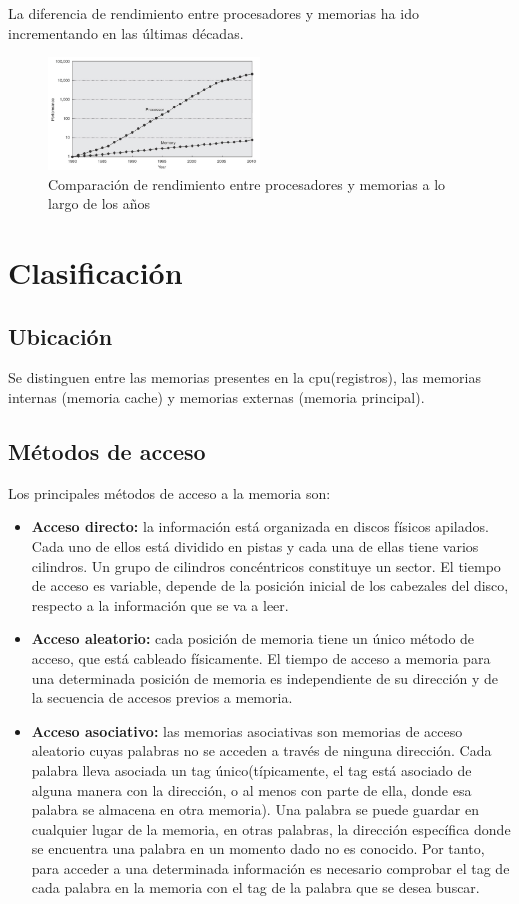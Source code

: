 La diferencia de rendimiento entre procesadores y memorias ha ido incrementando en las últimas décadas.
\begin{figure}[H]
	\centering
	\includegraphics[width=0.5\textwidth]{images/Tema_5/Grafico_Memorias.PNG}
	\caption{Comparación de rendimiento entre procesadores y memorias a lo largo de los años}
\end{figure}


\section{Clasificación}
\subsection{Ubicación}
Se distinguen entre las memorias presentes en la \gls{cpu}(registros), las memorias internas (memoria cache) y memorias externas (memoria principal).
\subsection{Métodos de acceso}
Los principales métodos de acceso a la memoria son:

\begin{itemize}
	\item\textbf{Acceso directo:} la información está organizada en discos físicos apilados. Cada uno de ellos está dividido en pistas y cada una de ellas tiene varios cilindros. Un  grupo de cilindros concéntricos constituye un sector. El tiempo de acceso es variable, depende de la posición inicial de los cabezales del disco, respecto a la información que se va a leer.
	\item\textbf{Acceso aleatorio:} cada posición de memoria tiene un único método de acceso, que está cableado físicamente. El tiempo de acceso a memoria para una determinada posición de memoria es independiente de su dirección y de la secuencia de accesos previos a memoria.
	\item\textbf{Acceso asociativo:} las memorias asociativas son memorias de acceso aleatorio cuyas palabras no se acceden a través de ninguna dirección. Cada palabra lleva asociada un tag único(típicamente, el tag está asociado de alguna manera con la dirección, o al menos con parte de ella, donde esa palabra se almacena en otra memoria). Una palabra se puede guardar en cualquier lugar de la memoria, en otras palabras, la dirección específica donde se encuentra una palabra en un momento dado no es conocido. Por tanto, para acceder a una determinada información es necesario comprobar el tag de cada palabra en la memoria con el tag de la palabra que se desea buscar.
\end{itemize}

